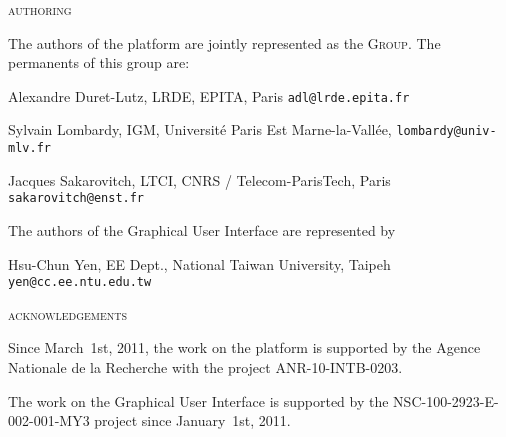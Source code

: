 \begin{center}
        \textsc{authoring}
    \end{center}

	\noindent 
The authors of the \vcsn platform are jointly represented  
 as the \vcsn \textsc{Group}.
% 
The permanents of this group are:

\medskip
	\noindent 
Alexandre Duret-Lutz, LRDE, EPITA, Paris 
\PushLine 
{\tt adl@lrde.epita.fr}

	\noindent 
Sylvain Lombardy, IGM, Universit\'e Paris Est Marne-la-Vall\'ee,
\PushLine 
 {\tt lombardy@univ-mlv.fr}
 
	\noindent 
Jacques Sakarovitch, LTCI, CNRS / Telecom-ParisTech, Paris 
\PushLine 
 {\tt sakarovitch@enst.fr}
 
 \bigskip
	\noindent 
The authors of the \vgi Graphical User Interface are represented by

\medskip
\noindent
Hsu-Chun Yen, EE Dept., National Taiwan University, Taipeh
\PushLine 
{\tt yen@cc.ee.ntu.edu.tw}


\vspace*{20pt}

\begin{center}
        \textsc{acknowledgements}
    \end{center}

\noindent
Since March~1st, 2011, the work on the \vcsn platform is supported by 
the Agence Nationale de la Recherche with the project 
ANR-10-INTB-0203.

\smallskip 
\noindent
The work on the Graphical User Interface \vgi is  supported by the  
NSC-100-2923-E-002-001-MY3  project since January~1st, 2011. 


% 
% 


\endinput 


